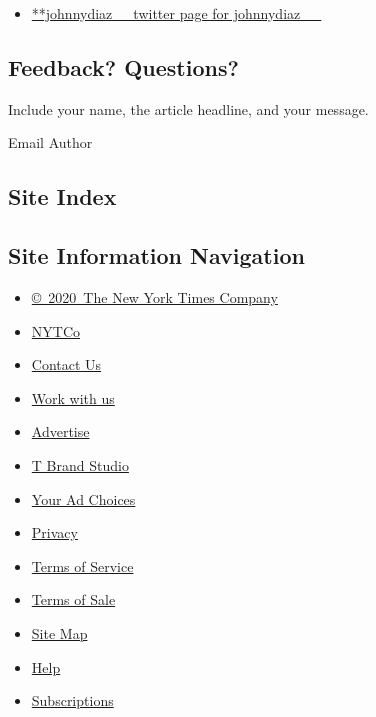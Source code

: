 \begin{itemize}
\tightlist
\item
  \href{https://twitter.com/johnnydiaz__}{**johnnydiaz\_\_twitter page
  for johnnydiaz\_\_}
\end{itemize}

\hypertarget{feedback-questions}{%
\subsection{Feedback? Questions?}\label{feedback-questions}}

Include your name, the article headline, and your message.

Email Author

\hypertarget{site-index}{%
\subsection{Site Index}\label{site-index}}

\hypertarget{site-information-navigation}{%
\subsection{Site Information
Navigation}\label{site-information-navigation}}

\begin{itemize}
\tightlist
\item
  \href{https://help.nytimes.com/hc/en-us/articles/115014792127-Copyright-notice}{©~2020~The
  New York Times Company}
\end{itemize}

\begin{itemize}
\tightlist
\item
  \href{https://www.nytco.com/}{NYTCo}
\item
  \href{https://help.nytimes.com/hc/en-us/articles/115015385887-Contact-Us}{Contact
  Us}
\item
  \href{https://www.nytco.com/careers/}{Work with us}
\item
  \href{https://nytmediakit.com/}{Advertise}
\item
  \href{http://www.tbrandstudio.com/}{T Brand Studio}
\item
  \href{https://www.nytimes.com/privacy/cookie-policy\#how-do-i-manage-trackers}{Your
  Ad Choices}
\item
  \href{https://www.nytimes.com/privacy}{Privacy}
\item
  \href{https://help.nytimes.com/hc/en-us/articles/115014893428-Terms-of-service}{Terms
  of Service}
\item
  \href{https://help.nytimes.com/hc/en-us/articles/115014893968-Terms-of-sale}{Terms
  of Sale}
\item
  \href{https://spiderbites.nytimes.com}{Site Map}
\item
  \href{https://help.nytimes.com/hc/en-us}{Help}
\item
  \href{https://www.nytimes.com/subscription?campaignId=37WXW}{Subscriptions}
\end{itemize}
